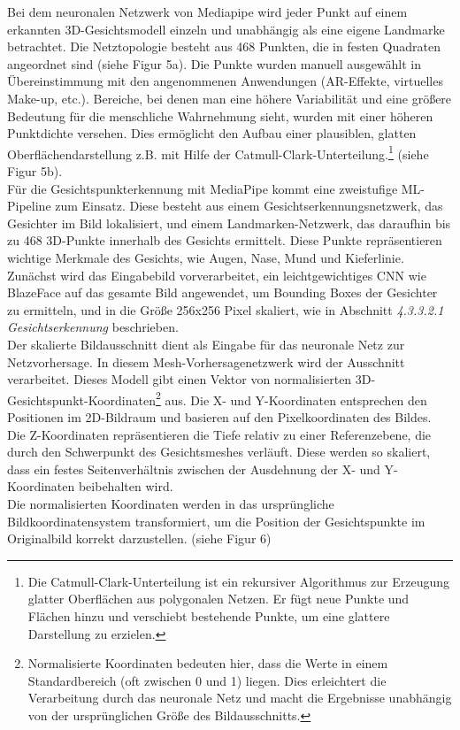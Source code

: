Bei dem neuronalen Netzwerk von Mediapipe wird jeder Punkt auf einem erkannten 3D-Gesichtsmodell einzeln und unabhängig als eine eigene Landmarke betrachtet. Die Netztopologie besteht aus 468 Punkten, die in festen Quadraten angeordnet sind (siehe Figur 5a). Die Punkte wurden manuell ausgewählt in Übereinstimmung mit den angenommenen Anwendungen (AR-Effekte, virtuelles Make-up, etc.). Bereiche, bei denen man eine höhere Variabilität und eine größere Bedeutung für die menschliche Wahrnehmung sieht, wurden mit einer höheren Punktdichte versehen. Dies ermöglicht den Aufbau einer plausiblen, glatten Oberflächendarstellung z.B. mit Hilfe der Catmull-Clark-Unterteilung.\footnote{Die Catmull-Clark-Unterteilung ist ein rekursiver Algorithmus zur Erzeugung glatter Oberflächen aus polygonalen Netzen. Er fügt neue Punkte und Flächen hinzu und verschiebt bestehende Punkte, um eine glattere Darstellung zu erzielen.} (siehe Figur 5b). \cite{Kartynnik.2019} \\
Für die Gesichtspunkterkennung mit MediaPipe kommt eine zweistufige ML-Pipeline zum Einsatz. Diese besteht aus einem Gesichtserkennungsnetzwerk, das Gesichter im Bild lokalisiert, und einem Landmarken-Netzwerk, das daraufhin bis zu 468 3D-Punkte innerhalb des Gesichts ermittelt. Diese Punkte repräsentieren wichtige Merkmale des Gesichts, wie Augen, Nase, Mund und Kieferlinie. \cite{mediapipe.docs} \\
Zunächst wird das Eingabebild vorverarbeitet, ein leichtgewichtiges CNN wie BlazeFace auf das gesamte Bild angewendet, um Bounding Boxes der Gesichter zu ermitteln, und in die Größe 256x256 Pixel skaliert, wie in Abschnitt \textit{4.3.3.2.1 Gesichtserkennung} beschrieben. \\
Der skalierte Bildausschnitt dient als Eingabe für das neuronale Netz zur Netzvorhersage. In diesem Mesh-Vorhersagenetzwerk wird der Ausschnitt verarbeitet. Dieses Modell gibt einen Vektor von normalisierten 3D-Gesichtspunkt-Koordinaten\footnote{Normalisierte Koordinaten bedeuten hier, dass die Werte in einem Standardbereich (oft zwischen 0 und 1) liegen. Dies erleichtert die Verarbeitung durch das neuronale Netz und macht die Ergebnisse unabhängig von der ursprünglichen Größe des Bildausschnitts.} aus. Die X- und Y-Koordinaten entsprechen den Positionen im 2D-Bildraum und basieren auf den Pixelkoordinaten des Bildes. Die Z-Koordinaten repräsentieren die Tiefe relativ zu einer Referenzebene, die durch den Schwerpunkt des Gesichtsmeshes verläuft. Diese werden so skaliert, dass ein festes Seitenverhältnis zwischen der Ausdehnung der X- und Y-Koordinaten beibehalten wird. \cite{Kartynnik.2019}\\
Die normalisierten Koordinaten werden in das ursprüngliche Bildkoordinatensystem transformiert, um die Position der Gesichtspunkte im Originalbild korrekt darzustellen. (siehe Figur 6) \\

